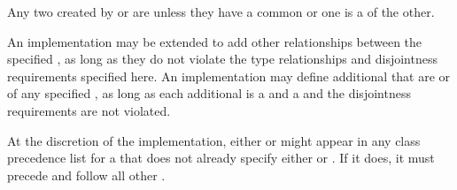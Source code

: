 \itemitem{\bull}
Any two   created by  
or 
are  unless they have a common  or
one  is a  of the other.

%

\itemitem{\bull} 
An implementation may be extended to add other 
relationships between the specified , as long as they do
not violate the type relationships and disjointness requirements
specified here.  An implementation may define additional 
that are  or  of any
specified , as long as each additional  is
a  and a  and the disjointness requirements
are not violated.
 
At the discretion of the implementation, either 
or  might appear in any class precedence list
for a  that does not already specify either 
 or .  If it does,
it must precede  and follow all other  .

